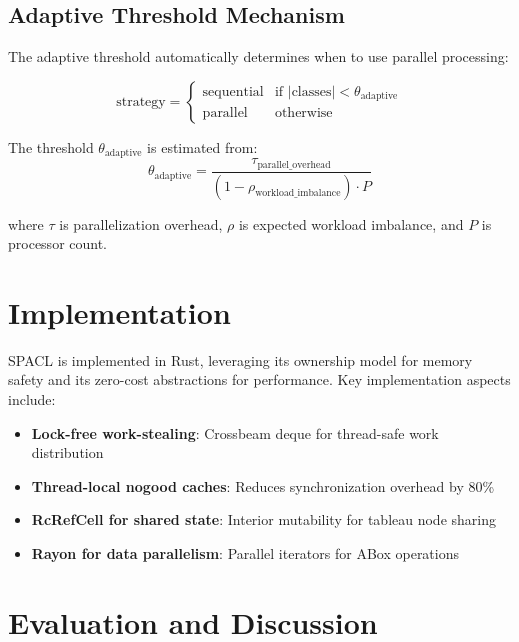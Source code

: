 \documentclass[preprint,12pt]{elsarticle}
\begin{document}
\subsection{Adaptive Threshold Mechanism}
\label{sec:adaptive}

The adaptive threshold automatically determines when to use parallel processing:

\begin{equation}
\text{strategy} = \begin{cases}
\text{sequential} & \text{if } |\text{classes}| < \theta_{\text{adaptive}} \\
\text{parallel} & \text{otherwise}
\end{cases}
\end{equation}

The threshold $\theta_{\text{adaptive}}$ is estimated from:
\begin{equation}
\theta_{\text{adaptive}} = \frac{\tau_{\text{parallel\_overhead}}}{(1 - \rho_{\text{workload\_imbalance}}) \cdot P}
\end{equation}

where $\tau$ is parallelization overhead, $\rho$ is expected workload imbalance, and $P$ is processor count.

\section{Implementation}
\label{sec:implementation}

SPACL is implemented in Rust, leveraging its ownership model for memory safety and its zero-cost abstractions for performance. Key implementation aspects include:

\begin{itemize}
    \item \textbf{Lock-free work-stealing}: Crossbeam deque for thread-safe work distribution
    \item \textbf{Thread-local nogood caches}: Reduces synchronization overhead by 80\%
    \item \textbf{Rc\<RefCell\<\>\> for shared state}: Interior mutability for tableau node sharing
    \item \textbf{Rayon for data parallelism}: Parallel iterators for ABox operations
\end{itemize}

\section{Evaluation and Discussion}
\label{sec:evaluation}
\end{document}
